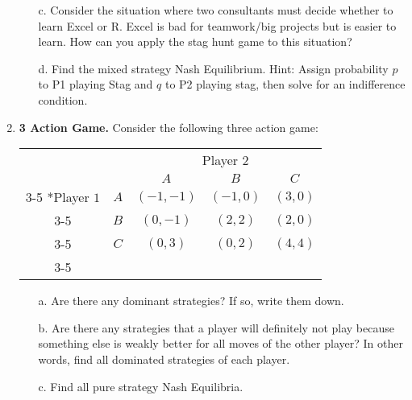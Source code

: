 \documentclass{article}
\begin{document}
\begin{enumerate}
\begin{enumerate}
          \item[c.] Consider the situation where two consultants must decide whether to learn Excel or R. Excel is bad for teamwork/big projects but is easier to learn. How can you apply the stag hunt game to this situation?
          
          \vspace{4cm}
          
          \item[d.] Find the mixed strategy Nash Equilibrium. Hint: Assign probability $p$ to P1 playing Stag and $q$ to P2 playing stag, then solve for an indifference condition.
          
          \vspace{6cm}
          
      \end{enumerate}
        \item \textbf{3 Action Game.} Consider the following three action game:
            \begin{table}[H]
    \begin{tabular}{cc|c|c|c|}
      & \multicolumn{1}{c}{} & \multicolumn{3}{c}{Player $2$}\\
      & \multicolumn{1}{c}{} & \multicolumn{1}{c}{$A$}  & \multicolumn{1}{c}{$B$} & \multicolumn{1}{c}{$C$}\\\cline{3-5}
      \multirow{3}*{Player $1$}  & $A$ & $(-1,-1)$ & $(-1,0)$  & $(3,0)$ \\\cline{3-5}
      & $B$ & $(0,-1)$ & $(2,2)$ & $(2,0)$ \\\cline{3-5}
      & $C$ & $(0,3)$ & $(0,2)$ & $(4,4)$ \\\cline{3-5}
    \end{tabular}
      \end{table}
    \begin{enumerate}
        \item[a.] Are there any dominant strategies? If so, write them down.
        
        \vspace{4cm}
        
        \item[b.] Are there any strategies that a player will definitely not play because something else is weakly better for all moves of the other player? In other words, find all dominated strategies of each player.
        
        \vspace{4cm}
        
        \item[c.] Find all pure strategy Nash Equilibria.
        

\end{enumerate}
\end{enumerate}
\end{document}
